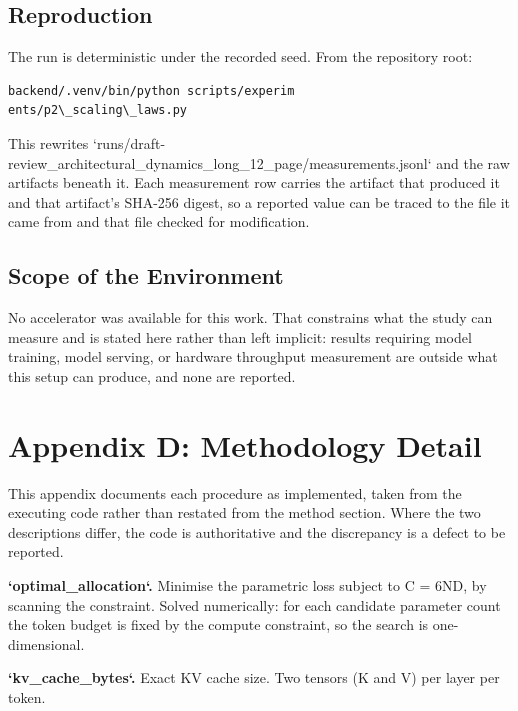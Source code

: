 \documentclass[10pt,journal,compsoc,twocolumn]{IEEEtran}
\begin{document}
\subsection{Reproduction}


The run is deterministic under the recorded seed. From the repository root:


\begin{scriptsize}
\begin{verbatim}
backend/.venv/bin/python scripts/experim
ents/p2\_scaling\_laws.py
\end{verbatim}
\end{scriptsize}


This rewrites `runs/draft-review\_architectural\_dynamics\_long\_12\_page/measurements.jsonl` and the raw artifacts beneath it. Each measurement row carries the artifact that produced it and that artifact's SHA-256 digest, so a reported value can be traced to the file it came from and that file checked for modification.


\subsection{Scope of the Environment}


No accelerator was available for this work. That constrains what the study can measure and is stated here rather than left implicit: results requiring model training, model serving, or hardware throughput measurement are outside what this setup can produce, and none are reported.




\section{Appendix D: Methodology Detail}


This appendix documents each procedure as implemented, taken from the executing code rather than restated from the method section. Where the two descriptions differ, the code is authoritative and the discrepancy is a defect to be reported.

\textbf{`optimal\_allocation`.} Minimise the parametric loss subject to C = 6ND, by scanning the constraint. Solved numerically: for each candidate parameter count the token budget is fixed by the compute constraint, so the search is one-dimensional.

\textbf{`kv\_cache\_bytes`.} Exact KV cache size. Two tensors (K and V) per layer per token.
\end{document}
